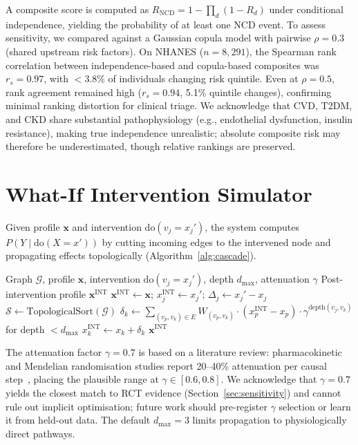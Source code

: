 \documentclass[runningheads]{llncs}
\begin{document}
A composite score is computed as
$R_{\mathrm{NCD}} = 1 - \prod_{d} (1 - R_d)$
under conditional independence, yielding the probability of at least
one NCD event.
To assess sensitivity, we compared against a Gaussian copula model
with pairwise $\rho = 0.3$ (shared upstream risk factors).
On NHANES ($n = 8{,}291$), the Spearman rank correlation between
independence-based and copula-based composites was $r_s = 0.97$,
with $<$3.8\% of individuals changing risk quintile.
Even at $\rho = 0.5$, rank agreement remained high
($r_s = 0.94$, 5.1\% quintile changes), confirming minimal
ranking distortion for clinical triage.
We acknowledge that CVD, T2DM, and CKD share substantial
pathophysiology (e.g., endothelial dysfunction, insulin
resistance), making true independence unrealistic;
absolute composite risk may therefore be underestimated,
though relative rankings are preserved.

\section{What-If Intervention Simulator}\label{sec:whatif}

Given profile $\mathbf{x}$ and intervention
$\mathrm{do}(v_j = x_j')$, the system computes
$P(Y \mid \mathrm{do}(X = x'))$ by cutting incoming edges to the
intervened node and propagating effects topologically
(Algorithm~\ref{alg:cascade}).

\begin{algorithm}[t]
\caption{Topological Intervention Cascade}
\label{alg:cascade}
\begin{algorithmic}[1]
\REQUIRE Graph $\mathcal{G}$, profile $\mathbf{x}$, intervention
  $\mathrm{do}(v_j = x_j')$, depth $d_{\max}$, attenuation $\gamma$
\ENSURE Post-intervention profile $\mathbf{x}^{\mathrm{INT}}$
\STATE $\mathbf{x}^{\mathrm{INT}} \leftarrow \mathbf{x}$;
  $x_j^{\mathrm{INT}} \leftarrow x_j'$;
  $\Delta_j \leftarrow x_j' - x_j$
\STATE $\mathcal{S} \leftarrow \text{TopologicalSort}(\mathcal{G})$
  \STATE $\delta_k \leftarrow \sum_{(v_p, v_k) \in E} W_{(v_p,v_k)} \cdot (x_p^{\mathrm{INT}} - x_p) \cdot \gamma^{\text{depth}(v_j,v_k)}$ for depth $< d_{\max}$
  \STATE $x_k^{\mathrm{INT}} \leftarrow x_k + \delta_k$
\ENDFOR
\RETURN $\mathbf{x}^{\mathrm{INT}}$
\end{algorithmic}
\end{algorithm}

The attenuation factor $\gamma = 0.7$ is based on a literature review:
pharmacokinetic and Mendelian randomisation studies report 20--40\%
attenuation per causal step~\cite{ctt2010,pearl2009causality},
placing the plausible range at $\gamma \in [0.6, 0.8]$.
We acknowledge that $\gamma = 0.7$ yields the closest match to RCT
evidence (Section~\ref{sec:sensitivity}) and cannot rule out
implicit optimisation; future work should pre-register $\gamma$
selection or learn it from held-out data.
The default $d_{\max} = 3$ limits propagation to physiologically
direct pathways.
\end{document}
